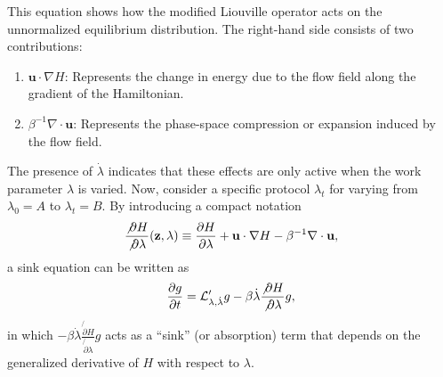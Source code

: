 This equation shows how the modified Liouville operator acts on the unnormalized equilibrium distribution. The right-hand side consists of two contributions:
\begin{enumerate}
	\item $\mathbf{u} \cdot \nabla H$: Represents the change in energy due to the flow field along the gradient of the Hamiltonian.
	\item $\beta^{-1} \nabla \cdot \mathbf{u}$: Represents the phase-space compression or expansion induced by the flow field.
\end{enumerate}
The presence of $\dot{\lambda}$ indicates that these effects are only active when the work parameter $\lambda$ is varied. Now, consider a specific protocol $\lambda_t$ for varying from $\lambda_0=A$ to $\lambda_t=B$. By introducing a compact notation
\begin{equation}
	\frac{\not \partial H}{\not \partial \lambda}(\mathbf{z}, \lambda) \equiv \frac{\partial H}{\partial \lambda}+\mathbf{u} \cdot \nabla H-\beta^{-1} \nabla \cdot \mathbf{u},
\end{equation}
a sink equation can be written as
\begin{equation}
	\frac{\partial g}{\partial t}=\mathcal{L}_{\lambda, \dot{\lambda}}^{\prime} g-\beta \dot{\lambda} \frac{\not \partial H}{\not \partial \lambda} g,\label{Eq:FEM:NEW:sink}
\end{equation}
in which $-\beta \dot{\lambda} \frac{\not{\partial} H}{\not{\partial} \lambda} g$ acts as a ``sink'' (or absorption) term that depends on the generalized derivative of $H$ with respect to $\lambda$.

